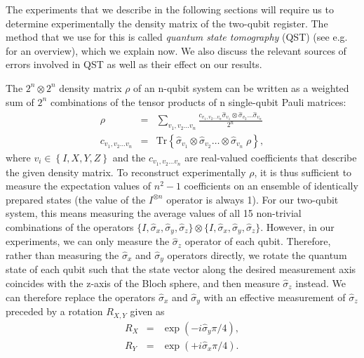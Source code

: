 The experiments that we describe in the following sections will require us to determine experimentally the density matrix of the two-qubit register. The method that we use for this is called {\it quantum state tomography} (QST) (see e.g. \cite{nielsen_quantum_2000} for an overview), which we explain now. We also discuss the relevant sources of errors involved in QST as well as their effect on our results.

\smallskip

The $2^n\otimes 2^n$ density matrix $\rho$ of an n-qubit system can be written as a weighted sum of $2^n$ combinations of the tensor products of n single-qubit Pauli matrices:
%
\begin{eqnarray}
\rho & = & \sum\limits_{v_1,v_2\hdots v_n} \frac{c_{v_1,v_2\hdots v_n} \hat{\sigma}_{v_1}\otimes \hat{\sigma}_{v_2}\hdots \hat{\sigma}_{v_n}}{2^n} \label{eq:state_tomography_state_representation} \\
c_{v_1,v_2\hdots v_n} & = & \mathrm{Tr}\left\{\hat{\sigma}_{v_1}\otimes \hat{\sigma}_{v_2}\hdots \otimes\hat{\sigma}_{v_n} \; \rho \right\}, \label{eq:state_tomography_coefficients}
\end{eqnarray}
%
where $v_i \in \left\{I,X,Y,Z\right\}$ and the $c_{v_1,v_2\hdots v_n}$ are real-valued coefficients that describe the given density matrix. To reconstruct experimentally $\rho$, it is thus sufficient to measure the expectation values of $n^2-1$ coefficients on an ensemble of identically prepared states (the value of the $I^{\otimes n}$ operator is always 1). For our two-qubit system, this means measuring the average values of all 15 non-trivial combinations of the operators $\{I,\hat{\sigma}_x,\hat{\sigma}_y,\hat{\sigma}_z\}\otimes\{I,\hat{\sigma}_x,\hat{\sigma}_y,\hat{\sigma}_z\}$. However, in our experiments, we can only measure the $\hat{\sigma}_z$ operator of each qubit. Therefore, rather than measuring the $\hat{\sigma}_x$ and $\hat{\sigma}_y$ operators directly, we rotate the quantum state of each qubit such that the state vector along the desired measurement axis coincides with the z-axis of the Bloch sphere, and then measure $\hat{\sigma}_z$ instead. We can therefore replace the operators $\hat{\sigma}_x$ and $\hat{\sigma}_y$ with an effective measurement of $\hat{\sigma}_z$ preceded by a rotation $R_{X,Y}$ given as
%
\begin{eqnarray}
R_{X} & = & \exp{\left( -i \hat{\sigma}_y \pi / 4\right)}, \\
R_{Y} & = & \exp{\left( +i \hat{\sigma}_x \pi / 4\right)}. 
\end{eqnarray}
